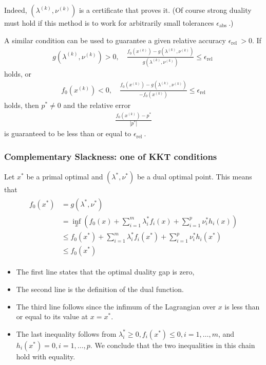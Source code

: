 \documentclass{article}
\begin{document}
Indeed, $\left(\lambda^{(k)}, \nu^{(k)}\right)$ is a certificate that proves it. (Of course strong duality must hold if this method is to work for arbitrarily small tolerances $\epsilon_{\text {abs }}$.)

A similar condition can be used to guarantee a given relative accuracy $\epsilon_{\text {rel }}>0$. If
\begin{align*}
g\left(\lambda^{(k)}, \nu^{(k)}\right)>0, \quad \frac{f_{0}\left(x^{(k)}\right)-g\left(\lambda^{(k)}, \nu^{(k)}\right)}{g\left(\lambda^{(k)}, \nu^{(k)}\right)} \leq \epsilon_{\text {rel }}
\end{align*}
holds, or
\begin{align*}
f_{0}\left(x^{(k)}\right)<0, \quad \frac{f_{0}\left(x^{(k)}\right)-g\left(\lambda^{(k)}, \nu^{(k)}\right)}{-f_{0}\left(x^{(k)}\right)} \leq \epsilon_{\mathrm{rel}}
\end{align*}
holds, then $p^*  \neq 0$ and the relative error
\begin{align*}
\frac{f_{0}\left(x^{(k)}\right)-p^* }{\left|p^* \right|}
\end{align*}
is guaranteed to be less than or equal to $\epsilon_{\text {rel }}$.
\subsubsection{Complementary Slackness: one of KKT conditions}

Let $x^* $ be a primal optimal and $\left(\lambda^* , \nu^* \right)$ be a dual optimal point. This means that
\begin{align*}
\begin{aligned}
f_{0}\left(x^* \right) &=g\left(\lambda^* , \nu^* \right) \\
&=\inf _{x}\left(f_{0}(x)+\sum_{i=1}^{m} \lambda_{i}^*  f_{i}(x)+\sum_{i=1}^{p} \nu_{i}^*  h_{i}(x)\right) \\
& \leq f_{0}\left(x^* \right)+\sum_{i=1}^{m} \lambda_{i}^*  f_{i}\left(x^* \right)+\sum_{i=1}^{p} \nu_{i}^*  h_{i}\left(x^* \right) \\
& \leq f_{0}\left(x^* \right)
\end{aligned}
\end{align*}
\begin{itemize}
    \item The first line states that the optimal duality gap is zero,
    \item The second line is the definition of the dual function.
    \item The third line follows since the infimum of the Lagrangian over $x$ is less than or equal to its value at $x=x^* $. 
    \item The last inequality follows from $\lambda_{i}^*  \geq 0, f_{i}\left(x^* \right) \leq 0, i=1, \ldots, m$, and $h_{i}\left(x^* \right)=0, i=1, \ldots, p$. We conclude that the two inequalities in this chain hold with equality.
\end{itemize}
\end{document}
